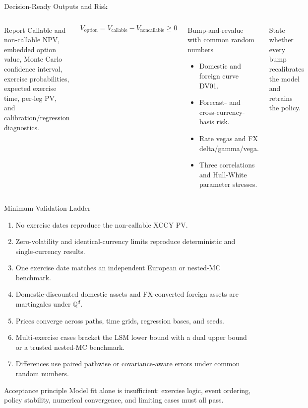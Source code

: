 \documentclass[aspectratio=169]{beamer}
\newcommand{\Qd}{\mathbb{Q}^{d}}
\begin{document}
\begin{frame}{Decision-Ready Outputs and Risk}
  \begin{columns}[T,onlytextwidth]
      \begin{block}{Report}
        Callable and non-callable NPV, embedded option value, Monte Carlo
        confidence interval, exercise probabilities, expected exercise time,
        per-leg PV, and calibration/regression diagnostics.
      \end{block}
      \[
        V_{\mathrm{option}}=V_{\mathrm{callable}}-V_{\mathrm{noncallable}}\ge0
      \]
      \begin{block}{Bump-and-revalue with common random numbers}
        \begin{itemize}
          \item Domestic and foreign curve DV01.
          \item Forecast- and cross-currency-basis risk.
          \item Rate vegas and FX delta/gamma/vega.
          \item Three correlations and Hull-White parameter stresses.
        \end{itemize}
      \end{block}
      State whether every bump recalibrates the model and retrains the policy.
  \end{columns}
\end{frame}

\begin{frame}{Minimum Validation Ladder}
  \small
  \begin{enumerate}
    \item No exercise dates reproduce the non-callable XCCY PV.
    \item Zero-volatility and identical-currency limits reproduce deterministic
      and single-currency results.
    \item One exercise date matches an independent European or nested-MC benchmark.
    \item Domestic-discounted domestic assets and FX-converted foreign assets
      are martingales under $\Qd$.
    \item Prices converge across paths, time grids, regression bases, and seeds.
    \item Multi-exercise cases bracket the LSM lower bound with a dual upper
      bound or a trusted nested-MC benchmark.
    \item Differences use paired pathwise or covariance-aware errors under
      common random numbers.
  \end{enumerate}
  \begin{alertblock}{Acceptance principle}
    Model fit alone is insufficient: exercise logic, event ordering, policy
    stability, numerical convergence, and limiting cases must all pass.
  \end{alertblock}
\end{frame}
\end{document}

